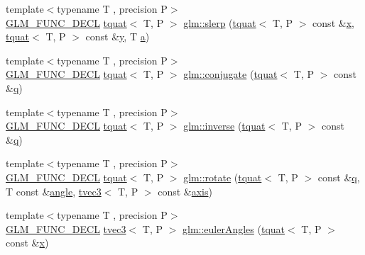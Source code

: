 \begin{DoxyCompactItemize}
{\footnotesize template$<$typename T , precision P$>$ }\\\mbox{\hyperlink{setup_8hpp_ab2d052de21a70539923e9bcbf6e83a51}{G\+L\+M\+\_\+\+F\+U\+N\+C\+\_\+\+D\+E\+CL}} \mbox{\hyperlink{structglm_1_1tquat}{tquat}}$<$ T, P $>$ \mbox{\hyperlink{group__gtc__quaternion_ga22b438c7252f3fa5b773c9882471652a}{glm\+::slerp}} (\mbox{\hyperlink{structglm_1_1tquat}{tquat}}$<$ T, P $>$ const \&\mbox{\hyperlink{glad_8h_a92d0386e5c19fb81ea88c9f99644ab1d}{x}}, \mbox{\hyperlink{structglm_1_1tquat}{tquat}}$<$ T, P $>$ const \&\mbox{\hyperlink{glad_8h_a66ddd433d2cacfe27f5906b7e86faeed}{y}}, T \mbox{\hyperlink{glad_8h_ac8729153468b5dcf13f971b21d84d4e5}{a}})
\item 
{\footnotesize template$<$typename T , precision P$>$ }\\\mbox{\hyperlink{setup_8hpp_ab2d052de21a70539923e9bcbf6e83a51}{G\+L\+M\+\_\+\+F\+U\+N\+C\+\_\+\+D\+E\+CL}} \mbox{\hyperlink{structglm_1_1tquat}{tquat}}$<$ T, P $>$ \mbox{\hyperlink{group__gtc__quaternion_gab1ace864fbf189ffa368950001808a3c}{glm\+::conjugate}} (\mbox{\hyperlink{structglm_1_1tquat}{tquat}}$<$ T, P $>$ const \&\mbox{\hyperlink{glad_8h_a514729309336df22bcc8eda979d6ced4}{q}})
\item 
{\footnotesize template$<$typename T , precision P$>$ }\\\mbox{\hyperlink{setup_8hpp_ab2d052de21a70539923e9bcbf6e83a51}{G\+L\+M\+\_\+\+F\+U\+N\+C\+\_\+\+D\+E\+CL}} \mbox{\hyperlink{structglm_1_1tquat}{tquat}}$<$ T, P $>$ \mbox{\hyperlink{group__gtc__quaternion_ga5f47300c024c2d809944e6ac661d6d14}{glm\+::inverse}} (\mbox{\hyperlink{structglm_1_1tquat}{tquat}}$<$ T, P $>$ const \&\mbox{\hyperlink{glad_8h_a514729309336df22bcc8eda979d6ced4}{q}})
\item 
{\footnotesize template$<$typename T , precision P$>$ }\\\mbox{\hyperlink{setup_8hpp_ab2d052de21a70539923e9bcbf6e83a51}{G\+L\+M\+\_\+\+F\+U\+N\+C\+\_\+\+D\+E\+CL}} \mbox{\hyperlink{structglm_1_1tquat}{tquat}}$<$ T, P $>$ \mbox{\hyperlink{group__gtc__quaternion_gaa8f42979c921e450ff2812fb43c25702}{glm\+::rotate}} (\mbox{\hyperlink{structglm_1_1tquat}{tquat}}$<$ T, P $>$ const \&\mbox{\hyperlink{glad_8h_a514729309336df22bcc8eda979d6ced4}{q}}, T const \&\mbox{\hyperlink{group__gtc__quaternion_gad4a4448baedb198b2b1e7880d2544dc9}{angle}}, \mbox{\hyperlink{structglm_1_1tvec3}{tvec3}}$<$ T, P $>$ const \&\mbox{\hyperlink{group__gtc__quaternion_ga0b3e87a13b2708154b72259e50789a19}{axis}})
\item 
{\footnotesize template$<$typename T , precision P$>$ }\\\mbox{\hyperlink{setup_8hpp_ab2d052de21a70539923e9bcbf6e83a51}{G\+L\+M\+\_\+\+F\+U\+N\+C\+\_\+\+D\+E\+CL}} \mbox{\hyperlink{structglm_1_1tvec3}{tvec3}}$<$ T, P $>$ \mbox{\hyperlink{group__gtc__quaternion_gadb92ec1c1b0dd6b024176a73fbef3e64}{glm\+::euler\+Angles}} (\mbox{\hyperlink{structglm_1_1tquat}{tquat}}$<$ T, P $>$ const \&\mbox{\hyperlink{glad_8h_a92d0386e5c19fb81ea88c9f99644ab1d}{x}})

\end{DoxyCompactItemize}
